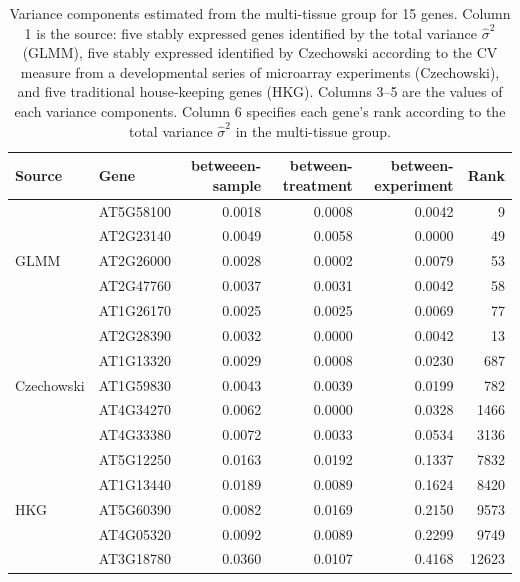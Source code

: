 \documentclass[11pt, a4paper]{article}
\begin{document}
\begin{table}[]
	\centering
	\caption{Variance components estimated from the multi-tissue group for 15 genes. Column 1 is the source: five stably expressed genes identified by the total variance $\hat{\sigma}^2$ (GLMM), five stably expressed identified by Czechowski according to the CV measure from a developmental series of microarray experiments (Czechowski), and  five traditional house-keeping genes (HKG). Columns 3--5 are the values of each variance components. Column 6 specifies each gene's rank according to the total variance $\hat{\sigma}^2$ in the multi-tissue group.}
	\label{table:15genes}
	\begin{tabular}{llrrrr}\\ \hline
		Source                        & Gene      & betweeen-sample & between-treatment & between-experiment & Rank  \\  \hline
		\multirow{5}{*}{GLMM}    & AT5G58100 & 0.0018          & 0.0008            & 0.0042             & 9     \\
		& AT2G23140 & 0.0049          & 0.0058            & 0.0000             & 49    \\
		& AT2G26000 & 0.0028          & 0.0002            & 0.0079             & 53    \\
		& AT2G47760 & 0.0037          & 0.0031            & 0.0042             & 58    \\
		& AT1G26170 & 0.0025          & 0.0025            & 0.0069             & 77    \\  \hline
		\multirow{5}{*}{Czechowski} & AT2G28390 & 0.0032          & 0.0000            & 0.0042             & 13    \\
		& AT1G13320 & 0.0029          & 0.0008            & 0.0230             & 687   \\
		& AT1G59830 & 0.0043          & 0.0039            & 0.0199             & 782   \\
		& AT4G34270 & 0.0062          & 0.0000            & 0.0328             & 1466  \\
		& AT4G33380 & 0.0072          & 0.0033            & 0.0534             & 3136  \\   \hline
	 \multirow{5}{*}{HKG}              & AT5G12250 & 0.0163          & 0.0192            & 0.1337             & 7832  \\   
		& AT1G13440 & 0.0189          & 0.0089            & 0.1624             & 8420  \\
		& AT5G60390 & 0.0082          & 0.0169            & 0.2150             & 9573  \\
		& AT4G05320 & 0.0092          & 0.0089            & 0.2299             & 9749  \\
		& AT3G18780 & 0.0360          & 0.0107            & 0.4168             & 12623  \\   \hline
	\end{tabular}
\end{table}
\end{document}
